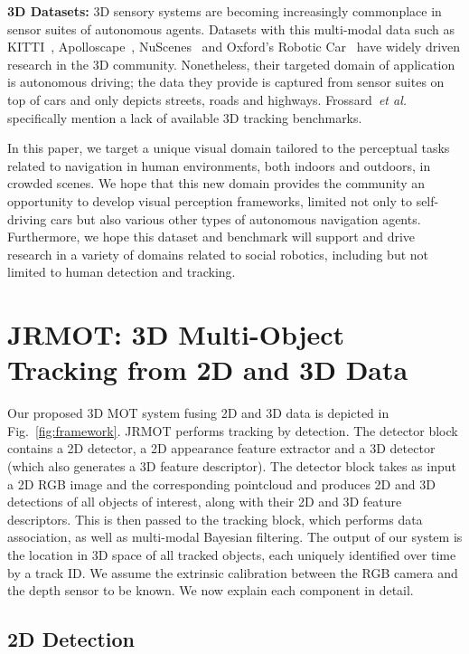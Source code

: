 \documentclass[letterpaper, 10 pt, conference]{ieeeconf}
\newcommand{\methodname}{{JRMOT}\xspace}
\newcommand{\etal}{\emph{et al.}\xspace}
\begin{document}
\textbf{3D Datasets:} 
3D sensory systems are becoming increasingly commonplace in sensor suites of autonomous agents. Datasets with this multi-modal data such as KITTI~\cite{Geiger2012CVPR}, Apolloscape~\cite{huang2018apolloscape}, NuScenes~\cite{caesar2020nuscenes} and Oxford's Robotic Car~\cite{RobotCarDatasetIJRR} have widely driven research in the 3D community. Nonetheless, their targeted domain of application is autonomous driving; the data they provide is captured from sensor suites on top of cars and only depicts streets, roads and highways. 
Frossard~\etal~\cite{frossard2018end} specifically mention a lack of available 3D tracking benchmarks.


In this paper, we target a unique visual domain tailored to the perceptual tasks related to navigation in human environments, both indoors and outdoors, in crowded scenes. We hope that this new domain provides the community an opportunity to develop visual perception frameworks, limited not only to self-driving cars but also various other types of autonomous navigation agents. Furthermore, we hope this dataset and benchmark will support and drive research in a variety of domains related to social robotics, including but not limited to human detection and tracking.


%
 \section{JRMOT: 3D Multi-Object Tracking from 2D and 3D Data}
\label{s:jrmot}

Our proposed 3D MOT system fusing 2D and 3D data is depicted in Fig.~\ref{fig:framework}. \methodname performs tracking by detection. The detector block contains a 2D detector, a 2D appearance feature extractor and a 3D detector (which also generates a 3D feature descriptor). The detector block takes as input a 2D RGB image and the corresponding pointcloud and produces 2D and 3D detections of all objects of interest, along with their 2D and 3D feature descriptors. This is then passed to the tracking block, which performs data association, as well as multi-modal Bayesian filtering. The output of our system is the location in 3D space of all tracked objects, each uniquely identified over time by a track ID. We assume the extrinsic calibration between the RGB camera and the depth sensor to be known. We now explain each component in detail.

\subsection{2D Detection}
\label{ss:2Ddetection}
\end{document}
